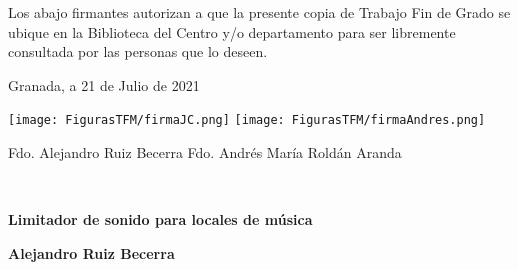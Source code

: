 \newpage
\thispagestyle{empty}
\noindent

\newpage
{}
\noindent
\blankpage

\bigskip

\noindent Los abajo firmantes autorizan a que la presente copia de
Trabajo Fin de Grado se ubique en la Biblioteca del Centro y/o
departamento para ser libremente consultada por las personas que lo
deseen.

\vspace*{1cm}

\begin{center}
Granada, a 21 de Julio de 2021
\par\end{center}

\bigskip
\bigskip

\begin{center}
\hspace{0cm}\texttt{[image: FigurasTFM/firmaJC.png]}\hspace{3cm} \texttt{[image: FigurasTFM/firmaAndres.png]}
\end{center}

\begin{doublespace}
\begin{center}
\hspace{0cm}Fdo. Alejandro Ruiz Becerra \hspace{3cm} Fdo. Andrés María Roldán Aranda
\end{center}
\end{doublespace}
~

\clearpage
{}
\noindent
\thispagestyle{empty}


\vspace{-1.48cm}
\begin{center}
    \textbf{\Large Limitador de sonido para locales de música}
\par\end{center}{\Large \par}

\begin{center}
    \textbf{\large Alejandro Ruiz Becerra}
    \par\end{center}{\large \par}

